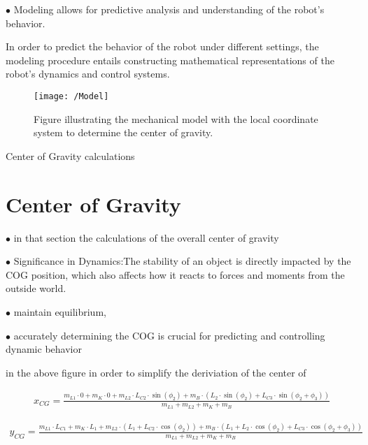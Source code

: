 $\bullet$ Modeling allows for predictive analysis and understanding of the robot's behavior.

In order to predict the behavior of the robot under different settings, the modeling procedure entails constructing mathematical representations of the robot's dynamics and control systems.



\begin{figure}[h]
	\centering
	\texttt{[image: /Model]}
	\caption[Mechanical model with the local coordinate system]{Figure illustrating the mechanical model with the local coordinate system to determine the center of gravity.}
	\label{Mechanical model with the local coordinate system}
\end{figure}

Center of Gravity calculations 
\section{Center of Gravity } 
$\bullet$ in that section the calculations of the overall center of gravity 

$\bullet$ Significance in Dynamics:The stability of an object is directly impacted by the COG position, which also affects how it reacts to forces and moments from the outside world.

$\bullet$ maintain equilibrium, 

$\bullet$ accurately determining the COG is crucial for predicting and controlling dynamic behavior


in the above figure in order to simplify the deriviation of the center of 

\begin{equation}
	\begin{aligned}
	x_{CG} = \frac{m_{L1} \cdot 0 + m_K \cdot 0 + m_{L2} \cdot L_{C2} \cdot \sin(\phi_2) + m_B \cdot (L_2 \cdot \sin(\phi_2) + L_{C3} \cdot \sin(\phi_2 + \phi_3))}{m_{L1} + m_{L2} + m_K + m_B}
	\end{aligned}
\end{equation}

\begin{equation}
	\begin{aligned}
	y_{CG} = \frac{m_{L1} \cdot L_{C1} + m_K \cdot L_1 + m_{L2} \cdot (L_1 + L_{C2} \cdot \cos(\phi_2)) + m_B \cdot (L_1 + L_2 \cdot \cos(\phi_2) + L_{C3} \cdot \cos(\phi_2 + \phi_3))}{m_{L1} + m_{L2} + m_K + m_B}
	\end{aligned}
\end{equation}

